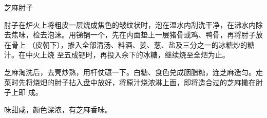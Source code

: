 \begin{recipe}{芝麻肘子}

\ingredients


\preparation

\step 肘子在炉火上将粗皮一层烧成焦色的皱纹状时，泡在温水内刮洗干净，在沸水内除
去焦味，检去泡沫。用锑锅一个，先在内面垫上一层猪骨或鸡、鸭骨，再将肘子放在骨上
（皮朝下），掺入全部清汤、料酒、姜、葱、盐及三分之一的冰糖炒的糖汁。在中火上烧
至五成钯时，再投入余下的冰糖，继续烧至全𤆵为止。

\step 芝麻淘洗后，去壳炒熟，用杆仗碾一下。白糖、食色兑成胭脂糖，连芝麻造匀。走
菜时先将烧𤆵的肘子拈入盘中放好，将原汁烧浓淋上面，即将造合过的芝麻撒在肘子上即
成。

\features

味甜咸，颜色深浓，有芝麻香味。

\end{recipe}

